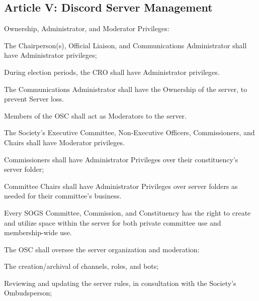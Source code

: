 







\subsection{Article V: Discord Server Management}
\begin{longenum}[ label*=\thesubsection.\arabic*., align=left] 
	\item Ownership, Administrator, and Moderator Privileges:
		\begin{longenum}[label*=\arabic*., align=left]
		\item The Chairperson(s), Official Liaison, and Communications Administrator shall have Administrator privileges;
			\begin{longenum}[label*=\arabic*., align=left]
			\item During election periods, the CRO shall have Administrator privileges.
			\end{longenum}	
		\item The Communications Administrator shall have the Ownership of the server, to prevent Server loss.
		\item Members of the OSC shall act as Moderators to the server.
		\item The Society's Executive Committee, Non-Executive Officers, Commissioners, and Chairs shall have Moderator privileges.
			\begin{longenum}[label*=\arabic*., align=left]
			\item Commissioners shall have Administrator Privileges over their constituency's server folder;
			\item Committee Chairs shall have Administrator Privileges over server folders as needed for their committee's business.
			\end{longenum}	
		\end{longenum}	
	\item Every SOGS Committee, Commission, and Constituency has the right to create and utilize space within the server for both private committee use and membership-wide use.
	\item The OSC shall oversee the server organization and moderation:
		\begin{longenum}[label*=\arabic*., align=left]
		\item The creation/archival of channels, roles, and bots;
		\item Reviewing and updating the server rules, in consultation with the Society's Ombudsperson;

\end{longenum}
\end{longenum}
